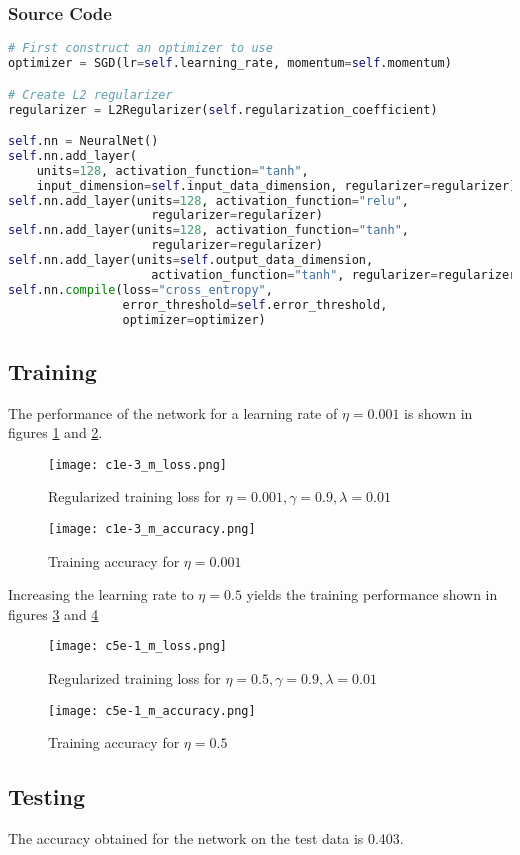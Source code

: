 \documentclass{article}
\begin{document}
\subsubsection{Source Code}
\begin{lstlisting}[language=python]
# First construct an optimizer to use
optimizer = SGD(lr=self.learning_rate, momentum=self.momentum)

# Create L2 regularizer
regularizer = L2Regularizer(self.regularization_coefficient)

self.nn = NeuralNet()
self.nn.add_layer(
    units=128, activation_function="tanh",
    input_dimension=self.input_data_dimension, regularizer=regularizer)
self.nn.add_layer(units=128, activation_function="relu",
                    regularizer=regularizer)
self.nn.add_layer(units=128, activation_function="tanh",
                    regularizer=regularizer)
self.nn.add_layer(units=self.output_data_dimension,
                    activation_function="tanh", regularizer=regularizer)
self.nn.compile(loss="cross_entropy",
                error_threshold=self.error_threshold,
                optimizer=optimizer)
\end{lstlisting}

\subsection{Training}
The performance of the network for a learning rate of $\eta = 0.001$ is shown in figures
\ref{fig:cifar_three_loss} and \ref{fig:cifar_three_accuracy}.

\begin{figure}[!ht]
  \texttt{[image: c1e-3\_m\_loss.png]}
  \caption{Regularized training loss for $\eta = 0.001, \gamma = 0.9, \lambda=0.01$}
  \label{fig:cifar_three_loss}
\end{figure}

\begin{figure}[!ht]
  \texttt{[image: c1e-3\_m\_accuracy.png]}
  \caption{Training accuracy for $\eta = 0.001$}
  \label{fig:cifar_three_accuracy}
\end{figure}

Increasing the learning rate to $\eta = 0.5$ yields the training performance shown in figures
\ref{fig:cifar_one_loss} and \ref{fig:cifar_one_accuracy}

\begin{figure}[!ht]
  \texttt{[image: c5e-1\_m\_loss.png]}
  \caption{Regularized training loss for $\eta = 0.5, \gamma = 0.9, \lambda=0.01$}
  \label{fig:cifar_one_loss}
\end{figure}

\begin{figure}[!ht]
  \texttt{[image: c5e-1\_m\_accuracy.png]}
  \caption{Training accuracy for $\eta = 0.5$}
  \label{fig:cifar_one_accuracy}
\end{figure}

\subsection{Testing}
The accuracy obtained for the network on the test data is 0.403.
\end{document}
